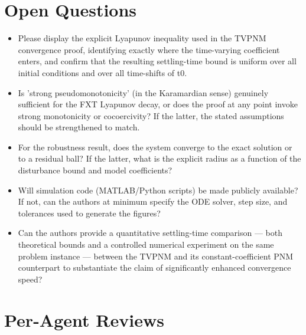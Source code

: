 \documentclass[11pt]{article}
\begin{document}
\section*{Open Questions}
\begin{itemize}[leftmargin=*]
  \item Please display the explicit Lyapunov inequality used in the TVPNM convergence proof, identifying exactly where the time-varying coefficient enters, and confirm that the resulting settling-time bound is uniform over all initial conditions and over all time-shifts of t0.
  \item Is 'strong pseudomonotonicity' (in the Karamardian sense) genuinely sufficient for the FXT Lyapunov decay, or does the proof at any point invoke strong monotonicity or cocoercivity? If the latter, the stated assumptions should be strengthened to match.
  \item For the robustness result, does the system converge to the exact solution or to a residual ball? If the latter, what is the explicit radius as a function of the disturbance bound and model coefficients?
  \item Will simulation code (MATLAB/Python scripts) be made publicly available? If not, can the authors at minimum specify the ODE solver, step size, and tolerances used to generate the figures?
  \item Can the authors provide a quantitative settling-time comparison — both theoretical bounds and a controlled numerical experiment on the same problem instance — between the TVPNM and its constant-coefficient PNM counterpart to substantiate the claim of significantly enhanced convergence speed?
\end{itemize}

\section*{Per-Agent Reviews}
\end{document}
